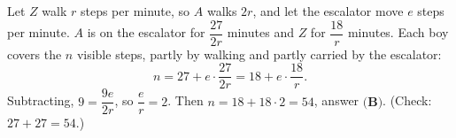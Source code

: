 Let $Z$ walk $r$ steps per minute, so $A$ walks $2r$, and let the escalator move $e$ steps per minute. $A$ is on the escalator for $\dfrac{27}{2r}$ minutes and $Z$ for $\dfrac{18}{r}$ minutes. Each boy covers the $n$ visible steps, partly by walking and partly carried by the escalator:
\[
n=27+e\cdot\dfrac{27}{2r}=18+e\cdot\dfrac{18}{r}.
\]
Subtracting, $9=\dfrac{9e}{2r}$, so $\dfrac {e}{r}=2$. Then $n=18+18\cdot2=\boxed{54}$, answer $\textbf{(B)}$. (Check: $27+27=54$.)
